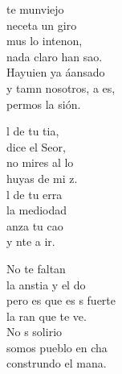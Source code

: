 \begin{cancion}%
	te munviejo\\
	neceta un giro \\
	mus lo intenon,\\
	nada claro han sao.\\
	Hayuien ya áansado\\
	y tamn nosotros, a es, \\
	permos la sión.\jump\\
	\begin{chorus}%
		l de tu tia,\\
		 dice el Seor,\\
		no mires al lo\\
		 huyas de mi z.\\
		l de tu erra\\
		la mediodad\\
		anza tu cao\\
		y nte a ir.\jump\\
	\end{chorus}%
	No te faltan\\
	la anstia y el do\\
	pero es que es s fuerte\\
	la ran que te ve.\\
	No s solirio\\
	somos pueblo en cha\\
	construndo el mana.\\
\end{cancion}%
